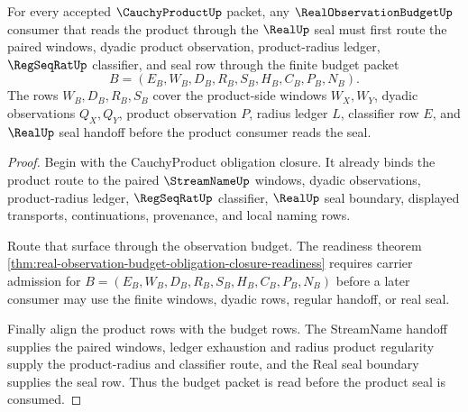 \begin{theorem}
\label{thm:cauchy-product-real-observation-budget-handoff}
For every accepted $\CauchyProductUp$ packet, any $\RealObservationBudgetUp$ consumer that reads the product through the $\RealUp$ seal must first route the paired windows, dyadic product observation, product-radius ledger, $\RegSeqRatUp$ classifier, and seal row through the finite budget packet
$$
B=(E_B,W_B,D_B,R_B,S_B,H_B,C_B,P_B,N_B).
$$
The rows $W_B,D_B,R_B,S_B$ cover the product-side windows $W_X,W_Y$, dyadic observations $Q_X,Q_Y$, product observation $P$, radius ledger $L$, classifier row $E$, and $\RealUp$ seal handoff before the product consumer reads the seal.
\end{theorem}
\begin{proof}
Begin with the CauchyProduct obligation closure. It already binds the product route to the paired $\StreamNameUp$ windows, dyadic observations, product-radius ledger, $\RegSeqRatUp$ classifier, $\RealUp$ seal boundary, displayed transports, continuations, provenance, and local naming rows.

Route that surface through the observation budget. The readiness theorem \autoref{thm:real-observation-budget-obligation-closure-readiness} requires carrier admission for $B=(E_B,W_B,D_B,R_B,S_B,H_B,C_B,P_B,N_B)$ before a later consumer may use the finite windows, dyadic rows, regular handoff, or real seal.

Finally align the product rows with the budget rows. The StreamName handoff supplies the paired windows, ledger exhaustion and radius product regularity supply the product-radius and classifier route, and the Real seal boundary supplies the seal row. Thus the budget packet is read before the product seal is consumed.
\end{proof}

